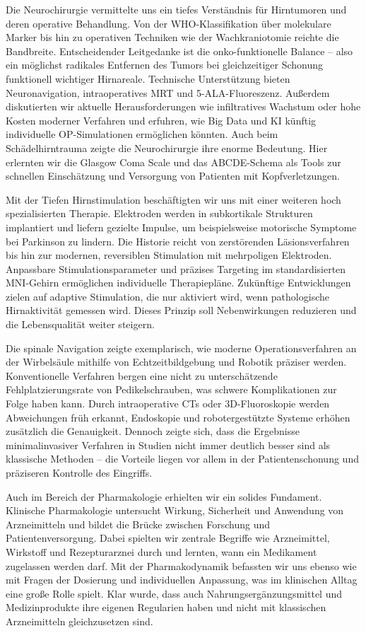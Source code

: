 \documentclass{article}
\begin{document}
Die Neurochirurgie vermittelte uns ein tiefes Verständnis für Hirntumoren und deren operative Behandlung. Von der WHO-Klassifikation über molekulare Marker bis hin zu operativen Techniken wie der Wachkraniotomie reichte die Bandbreite. Entscheidender Leitgedanke ist die onko-funktionelle Balance – also ein möglichst radikales Entfernen des Tumors bei gleichzeitiger Schonung funktionell wichtiger Hirnareale. Technische Unterstützung bieten Neuronavigation, intraoperatives MRT und 5-ALA-Fluoreszenz. Außerdem diskutierten wir aktuelle Herausforderungen wie infiltratives Wachstum oder hohe Kosten moderner Verfahren und erfuhren, wie Big Data und KI künftig individuelle OP-Simulationen ermöglichen könnten. Auch beim Schädelhirntrauma zeigte die Neurochirurgie ihre enorme Bedeutung. Hier erlernten wir die Glasgow Coma Scale und das ABCDE-Schema als Tools zur schnellen Einschätzung und Versorgung von Patienten mit Kopfverletzungen.

Mit der Tiefen Hirnstimulation beschäftigten wir uns mit einer weiteren hoch spezialisierten Therapie. Elektroden werden in subkortikale Strukturen implantiert und liefern gezielte Impulse, um beispielsweise motorische Symptome bei Parkinson zu lindern. Die Historie reicht von zerstörenden Läsionsverfahren bis hin zur modernen, reversiblen Stimulation mit mehrpoligen Elektroden. Anpassbare Stimulationsparameter und präzises Targeting im standardisierten MNI-Gehirn ermöglichen individuelle Therapiepläne. Zukünftige Entwicklungen zielen auf adaptive Stimulation, die nur aktiviert wird, wenn pathologische Hirnaktivität gemessen wird. Dieses Prinzip soll Nebenwirkungen reduzieren und die Lebensqualität weiter steigern.

Die spinale Navigation zeigte exemplarisch, wie moderne Operationsverfahren an der Wirbelsäule mithilfe von Echtzeitbildgebung und Robotik präziser werden. Konventionelle Verfahren bergen eine nicht zu unterschätzende Fehlplatzierungsrate von Pedikelschrauben, was schwere Komplikationen zur Folge haben kann. Durch intraoperative CTs oder 3D-Fluoroskopie werden Abweichungen früh erkannt, Endoskopie und robotergestützte Systeme erhöhen zusätzlich die Genauigkeit. Dennoch zeigte sich, dass die Ergebnisse minimalinvasiver Verfahren in Studien nicht immer deutlich besser sind als klassische Methoden – die Vorteile liegen vor allem in der Patientenschonung und präziseren Kontrolle des Eingriffs.

Auch im Bereich der Pharmakologie erhielten wir ein solides Fundament. Klinische Pharmakologie untersucht Wirkung, Sicherheit und Anwendung von Arzneimitteln und bildet die Brücke zwischen Forschung und Patientenversorgung. Dabei spielten wir zentrale Begriffe wie Arzneimittel, Wirkstoff und Rezepturarznei durch und lernten, wann ein Medikament zugelassen werden darf. Mit der Pharmakodynamik befassten wir uns ebenso wie mit Fragen der Dosierung und individuellen Anpassung, was im klinischen Alltag eine große Rolle spielt. Klar wurde, dass auch Nahrungsergänzungsmittel und Medizinprodukte ihre eigenen Regularien haben und nicht mit klassischen Arzneimitteln gleichzusetzen sind.
\end{document}
